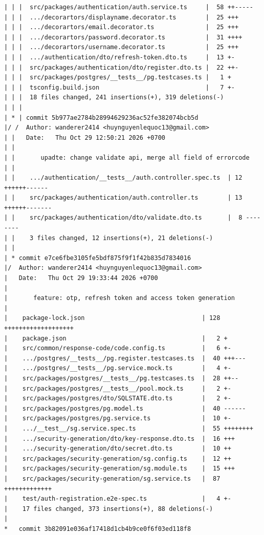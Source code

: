 \documentclass[12pt]{article}
\begin{document}
\begin{lstlisting}[numbers=none,breaklines=true]
| | |  src/packages/authentication/auth.service.ts     |  58 ++-----
| | |  .../decorartors/displayname.decorator.ts        |  25 +++
| | |  .../decorartors/email.decorator.ts              |  25 +++
| | |  .../decorartors/password.decorator.ts           |  31 ++++
| | |  .../decorartors/username.decorator.ts           |  25 +++
| | |  .../authentication/dto/refresh-token.dto.ts     |  13 +-
| | |  src/packages/authentication/dto/register.dto.ts |  22 ++-
| | |  src/packages/postgres/__tests__/pg.testcases.ts |   1 +
| | |  tsconfig.build.json                             |   7 +-
| | |  18 files changed, 241 insertions(+), 319 deletions(-)
| | |
| * | commit 5b977ae2784b28994629236ac52fe382074bcb5d
|/ /  Author: wanderer2414 <huynguyenlequoc13@gmail.com>
| |   Date:   Thu Oct 29 12:50:21 2026 +0700
| |
| |       upadte: change validate api, merge all field of errorcode
| |
| |    .../authentication/__tests__/auth.controller.spec.ts  | 12 ++++++------
| |    src/packages/authentication/auth.controller.ts        | 13 ++++++-------
| |    src/packages/authentication/dto/validate.dto.ts       |  8 --------
| |    3 files changed, 12 insertions(+), 21 deletions(-)
| |
| * commit e7ce6fbe3105fe5bdf875f9f1f42b835d7834016
|/  Author: wanderer2414 <huynguyenlequoc13@gmail.com>
|   Date:   Thu Oct 29 19:33:44 2026 +0700
|
|       feature: otp, refresh token and access token generation
|
|    package-lock.json                                | 128 +++++++++++++++++++
|    package.json                                     |   2 +
|    src/common/response-code/code.config.ts          |   6 +-
|    .../postgres/__tests__/pg.register.testcases.ts  |  40 +++---
|    .../postgres/__tests__/pg.service.mock.ts        |   4 +-
|    src/packages/postgres/__tests__/pg.testcases.ts  |  28 ++--
|    src/packages/postgres/__tests__/pool.mock.ts     |   2 +-
|    src/packages/postgres/dto/SQLSTATE.dto.ts        |   2 +-
|    src/packages/postgres/pg.model.ts                |  40 ------
|    src/packages/postgres/pg.service.ts              |  10 +-
|    .../__test__/sg.service.spec.ts                  |  55 ++++++++
|    .../security-generation/dto/key-response.dto.ts  |  16 +++
|    .../security-generation/dto/secret.dto.ts        |  10 ++
|    src/packages/security-generation/sg.config.ts    |  12 ++
|    src/packages/security-generation/sg.module.ts    |  15 +++
|    src/packages/security-generation/sg.service.ts   |  87 +++++++++++++
|    test/auth-registration.e2e-spec.ts               |   4 +-
|    17 files changed, 373 insertions(+), 88 deletions(-)
|
*   commit 3b82091e036af17418d1cb4b9ce0f6f03ed118f8

\end{lstlisting}
\end{document}
